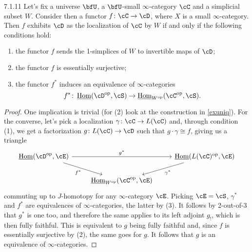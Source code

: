 \begin{prop}
  7.1.11
  Let's fix a universe $\bfU$, a $\bfU$-small $\infty$-category $\cC$ and a
  simplicial subset $W$. Consider then a functor $f\colon\cC\rightarrow\cD$,
  where $X$ is a small $\infty$-category. Then $f$ exhibits $\cD$ as the
  localization of $\cC$ by $W$ if and only if the following conditions hold:
  \begin{enumerate}
    \item the functor $f$ sends the 1-simplices of $W$ to invertible maps of
      $\cD$;
    \item the functor $f$ is essentially surjective;
    \item the functor $f^*$ induces an equivalence of $\infty$-categories
      \[f^*\colon\home(\cD^{\op},\cS)\rightarrow\home_{W^{\op}}(\cC^{\op},\cS).\]
  \end{enumerate}
\end{prop}
\begin{proof}
  One implication is trivial (for (2) look at the construction in \ref{exuniq}).
  For the converse, let's pick a localization $\gamma\colon\cC\rightarrow
  L(\cC)$ and, through condition (1), we get a factorization $g\colon
  L(\cC)\rightarrow\cD$ such that $g\cdot\gamma\cong f$, giving us a triangle
  \[\begin{tikzcd}
    {\home(\cD^{\op},\cE)} && {\home(L(\cC)^{\op},\cE)} \\
                           & {\home_{W^{\op}}(\cC^{\op},\cE)}
    \arrow["{g^*}", from=1-1, to=1-3]
    \arrow["{f^*}"', from=1-1, to=2-2]
    \arrow["{\gamma^*}", from=1-3, to=2-2]
  \end{tikzcd}\]
  commuting up to $J$-homotopy for any $\infty$-category $\cE$. Picking
  $\cE=\cS$, $\gamma^*$ and $f^*$ are equivalences
  of $\infty$-categories, the latter by (3). It follows by 2-out-of-3 that $g^*$
  is one too, and therefore the same applies to its left adjoint $g_!$, which is
  then fully faithful. This is equivalent to $g$ being fully faithful  and, since
  $f$ is essentially surjective by (2), the same goes for $g$. It follows that
  $g$ is an equivalence of $\infty$-categories.
\end{proof}

